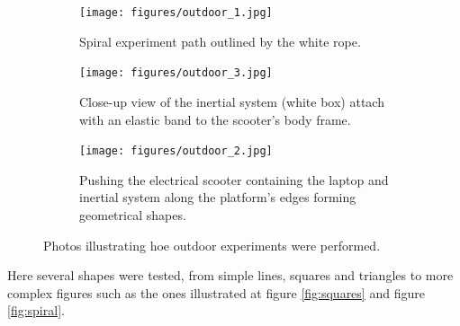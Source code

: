 \begin{figure}[!h]
    \centering
    \begin{subfigure}{0.8\textwidth}
        \centering
        \texttt{[image: figures/outdoor\_1.jpg]}
        \caption{ Spiral experiment path outlined by the white rope. }
        \label{fig:outdoor_1}
    \end{subfigure}

    \begin{subfigure}{0.40\textwidth}
        \centering
        \texttt{[image: figures/outdoor\_3.jpg]}
        \caption{ Close-up view of the inertial system (white box) attach with an elastic band to the scooter's body frame. }
        \label{fig:outdoor_2}
    \end{subfigure}
    \begin{subfigure}{0.40\textwidth}
        \centering
        \texttt{[image: figures/outdoor\_2.jpg]}
        \caption{ Pushing the electrical scooter containing the laptop and inertial system along the platform's edges forming geometrical shapes. }
        \label{fig:outdoor_3}
    \end{subfigure}
    \caption{ Photos illustrating hoe outdoor experiments were performed.}
    \label{fig:outdoor_experiments}
\end{figure}

Here several shapes were tested, from simple lines, squares and triangles to more complex figures such as the ones illustrated at figure \ref{fig:squares} and figure \ref{fig:spiral}.

